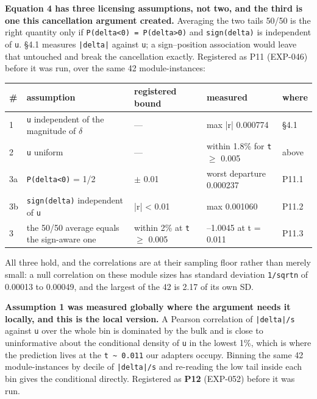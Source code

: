 \textbf{Equation 4 has three licensing assumptions, not two, and the third is one this cancellation argument created.} Averaging the two tails 50/50 is the right quantity only if \texttt{P(delta<0) = P(delta>0)} and \texttt{sign(delta)} is independent of \texttt{u}. \S{}4.1 measures \texttt{|delta|} against \texttt{u}; a sign--position association would leave that untouched and break the cancellation exactly. Registered as P11 (EXP-046) before it was run, over the same 42 module-instances:

\begin{table}[t]
\centering\footnotesize
\begin{tabularx}{\textwidth}{l>{\hsize=1.418\hsize\raggedright\arraybackslash}X>{\hsize=0.725\hsize\raggedright\arraybackslash}X>{\hsize=0.857\hsize\raggedright\arraybackslash}Xl}
\toprule
\# & assumption & registered bound & measured & where \\
\midrule
1 & \texttt{u} independent of the magnitude of $\delta$ & --- & max |r| 0.000774 & \S{}4.1 \\
2 & \texttt{u} uniform & --- & within 1.8\% for \texttt{t} $\geq$ 0.005 & above \\
3a & \texttt{P(delta<0)} = 1/2 & 0.5 $\pm$ 0.01 & worst departure 0.000237 & P11.1 \\
3b & \texttt{sign(delta)} independent of \texttt{u} & |r| < 0.01 & max 0.001060 & P11.2 \\
3 & the 50/50 average equals the sign-aware one & within 2\% at \texttt{t} $\geq$ 0.005 & 0.9936--1.0045 at t = 0.011 & P11.3 \\
\bottomrule
\end{tabularx}
\end{table}

All three hold, and the correlations are at their sampling floor rather than merely small: a null correlation on these module sizes has standard deviation \texttt{1/\allowbreak{}sqrtn} of 0.00013 to 0.00049, and the largest of the 42 is 2.17 of its own SD.

\textbf{Assumption 1 was measured globally where the argument needs it locally, and this is the local version.} A Pearson correlation of \texttt{|delta|/\allowbreak{}s} against \texttt{u} over the whole bin is dominated by the bulk and is close to uninformative about the conditional density of \texttt{u} in the lowest 1\%, which is where the prediction lives at the \texttt{t \textasciitilde{} 0.\allowbreak{}011} our adapters occupy. Binning the same 42 module-instances by decile of \texttt{|delta|/\allowbreak{}s} and re-reading the low tail inside each bin gives the conditional directly. Registered as \textbf{P12} (EXP-052) before it was run.

